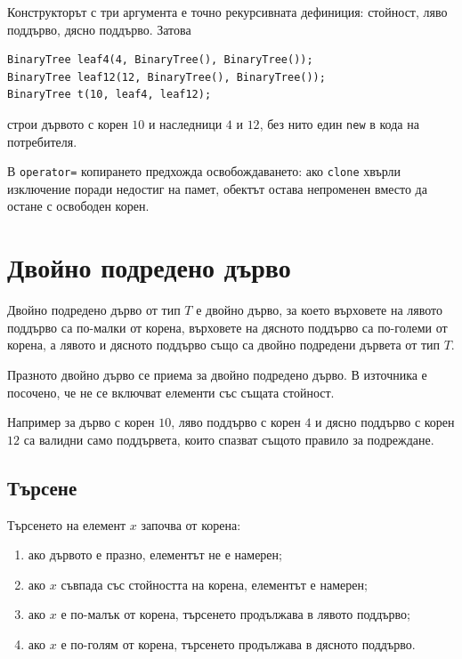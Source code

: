 Конструкторът с три аргумента е точно рекурсивната дефиниция: стойност, ляво
поддърво, дясно поддърво. Затова
\begin{verbatim}
BinaryTree leaf4(4, BinaryTree(), BinaryTree());
BinaryTree leaf12(12, BinaryTree(), BinaryTree());
BinaryTree t(10, leaf4, leaf12);
\end{verbatim}
строи дървото с корен $10$ и наследници $4$ и $12$, без нито един \verb|new| в
кода на потребителя.

В \verb|operator=| копирането предхожда освобождаването: ако \verb|clone| хвърли
изключение поради недостиг на памет, обектът остава непроменен вместо да остане
с освободен корен.

\section{Двойно подредено дърво}\label{s:18.7}

\begin{defn}
Двойно подредено дърво от тип $T$ е двойно дърво, за което върховете на лявото поддърво са по-малки от корена, върховете на дясното поддърво са по-големи от корена, а лявото и дясното поддърво също са двойно подредени дървета от тип $T$.
\end{defn}

Празното двойно дърво се приема за двойно подредено дърво. В източника е посочено, че не се включват елементи със същата стойност.

Например за дърво с корен $10$, ляво поддърво с корен $4$ и дясно поддърво с корен $12$ са валидни само поддървета, които спазват същото правило за подреждане.

\subsection{Търсене}\label{s:18.7.1}

Търсенето на елемент $x$ започва от корена:

\begin{enumerate}
    \item ако дървото е празно, елементът не е намерен;
    \item ако $x$ съвпада със стойността на корена, елементът е намерен;
    \item ако $x$ е по-малък от корена, търсенето продължава в лявото поддърво;
    \item ако $x$ е по-голям от корена, търсенето продължава в дясното поддърво.
\end{enumerate}

